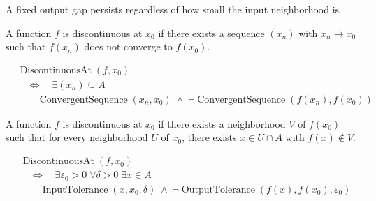 \begin{remark*}[Interpretation]
A fixed output gap persists regardless of how small the input neighborhood is.
\end{remark*}


\begin{definition}
\label{def:sequential-discontinuity-at-a-point}
A function $f$ is discontinuous at $x_0$ if there exists a sequence
$(x_n)$ with $x_n \to x_0$ such that $f(x_n)$ does not converge to $f(x_0)$.
\end{definition}

\begin{remark*}
\[
\begin{aligned}
&\operatorname{DiscontinuousAt}(f,x_0) \\
&\quad\Longleftrightarrow\quad
\exists (x_n)\subseteq A \\
&\qquad \operatorname{ConvergentSequence}(x_n,x_0)
\;\wedge\;
\neg \operatorname{ConvergentSequence}(f(x_n),f(x_0))
\end{aligned}
\]
\end{remark*}


\begin{definition}
\label{def:neighborhood-discontinuity-at-a-point}
A function $f$ is discontinuous at $x_0$ if there exists a neighborhood
$V$ of $f(x_0)$ such that for every neighborhood $U$ of $x_0$, there exists
$x \in U \cap A$ with $f(x) \notin V$.
\end{definition}

\begin{remark*}
\[
\begin{aligned}
&\operatorname{DiscontinuousAt}(f,x_0) \\
&\quad\Longleftrightarrow\quad
\exists \varepsilon_0 > 0 \; \forall \delta > 0 \; \exists x \in A \\
&\qquad \operatorname{InputTolerance}(x,x_0,\delta)
\;\wedge\;
\neg \operatorname{OutputTolerance}(f(x),f(x_0),\varepsilon_0)
\end{aligned}
\]
\end{remark*}

